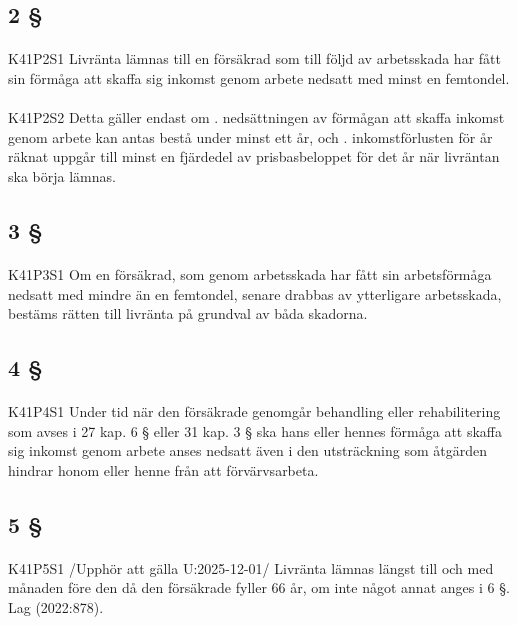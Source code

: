 \documentclass[a4paper,notitlepage,openany,10pt]{book}
\begin{document}
\subsection*{2 §}
\paragraph*{}
{\tiny K41P2S1}
Livränta lämnas till en försäkrad som till följd av arbetsskada har fått sin förmåga att skaffa sig inkomst genom arbete nedsatt med minst en femtondel.
\paragraph*{}
{\tiny K41P2S2}
Detta gäller endast om
. nedsättningen av förmågan att skaffa inkomst genom arbete kan antas bestå under minst ett år, och
. inkomstförlusten för år räknat uppgår till minst en fjärdedel av prisbasbeloppet för det år när livräntan ska börja lämnas.
\subsection*{3 §}
\paragraph*{}
{\tiny K41P3S1}
Om en försäkrad, som genom arbetsskada har fått sin arbetsförmåga nedsatt med mindre än en femtondel, senare drabbas av ytterligare arbetsskada, bestäms rätten till livränta på grundval av båda skadorna.
\subsection*{4 §}
\paragraph*{}
{\tiny K41P4S1}
Under tid när den försäkrade genomgår behandling eller rehabilitering som avses i 27 kap. 6 § eller 31 kap. 3 § ska hans eller hennes förmåga att skaffa sig inkomst genom arbete anses nedsatt även i den utsträckning som åtgärden hindrar honom eller henne från att förvärvsarbeta.
\subsection*{5 §}
\paragraph*{}
{\tiny K41P5S1}
/Upphör att gälla U:2025-12-01/
Livränta lämnas längst till och med månaden före den då den försäkrade fyller 66 år, om inte något annat anges i 6 §.
Lag (2022:878).
\end{document}

